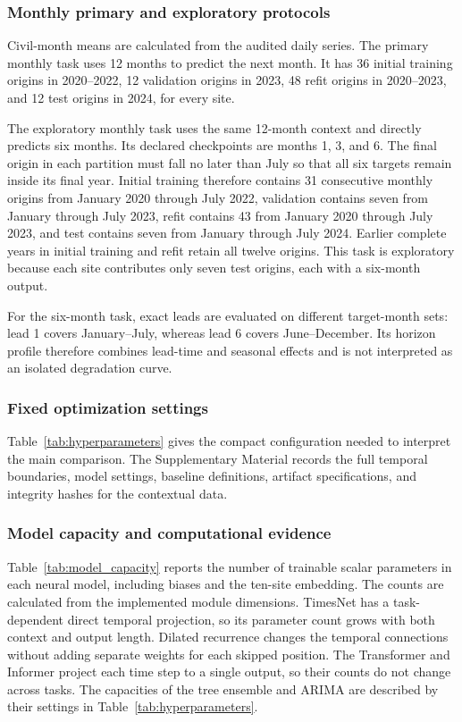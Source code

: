 \subsubsection{Monthly primary and exploratory protocols}

Civil-month means are calculated from the audited daily series. The primary
monthly task uses 12 months to predict the next month. It has 36 initial training
origins in 2020--2022, 12 validation origins in 2023, 48 refit origins in
2020--2023, and 12 test origins in 2024, for every site.

The exploratory monthly task uses the same 12-month context and directly
predicts six months. Its declared checkpoints are months 1, 3, and 6.
The final origin in each partition must fall no later than July so that all
six targets remain inside its final year. Initial training therefore contains
31 consecutive monthly origins from January 2020 through July 2022, validation
contains seven from January through July 2023, refit contains 43 from January
2020 through July 2023, and test contains seven from January through July 2024.
Earlier complete years in initial training and refit retain all twelve origins.
This task is exploratory because each site contributes
only seven test origins, each with a six-month output.

For the six-month task, exact leads are evaluated on different target-month
sets: lead 1 covers January--July, whereas lead 6 covers June--December. Its
horizon profile therefore combines lead-time and seasonal effects and is not
interpreted as an isolated degradation curve.

\subsubsection{Fixed optimization settings}

Table~\ref{tab:hyperparameters} gives the compact configuration needed to
interpret the main comparison. The Supplementary Material records the
full temporal boundaries, model settings, baseline definitions, artifact
specifications, and integrity hashes for the contextual data.



\subsubsection{Model capacity and computational evidence}

Table~\ref{tab:model_capacity} reports the number of trainable scalar
parameters in each neural model, including biases and the ten-site embedding.
The counts are calculated from the implemented module dimensions. TimesNet has a task-dependent direct temporal
projection, so its parameter count grows with both context and output length.
Dilated recurrence changes the temporal connections without adding separate
weights for each skipped position. The Transformer and Informer project each
time step to a single output, so their counts do not change across tasks.
The capacities of the tree ensemble and ARIMA are described by their
settings in Table~\ref{tab:hyperparameters}.

